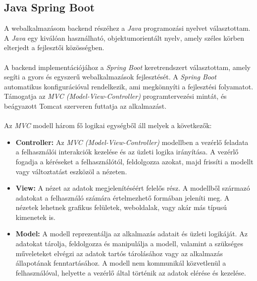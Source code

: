 \subsection{Java Spring Boot}

A webalkalmazásom backend részéhez a \textit{Java} \cite{java} programozási nyelvet választottam. A \textit{Java} egy kiválóan használható, objektumorientált nyelv, amely széles körben elterjedt a fejlesztői közösségben.\\
\\
A backend implementációjához a \textit{Spring Boot} \cite{spring_boot} keretrendszert választottam, amely segíti a gyors és egyszerű webalkalmazások fejlesztését. A \textit{Spring Boot} automatikus konfigurációval rendelkezik, ami megkönnyíti a fejlesztési folyamatot. Támogatja az \textit{MVC (Model-View-Controller)} \cite{mvc} programtervezési mintát, és beágyazott Tomcat szerveren futtatja az alkalmazást.\\ 
\\
Az \textit{MVC} modell három fő logikai egységből áll melyek a következők:

\begin{itemize}
\item \textbf{Controller:} Az \textit{MVC (Model-View-Controller)} modellben a vezérlő feladata a felhasználói interakciók kezelése és az üzleti logika irányítása. A vezérlő fogadja a kéréseket a felhasználótól, feldolgozza azokat, majd frissíti a modellt vagy változtatást eszközöl a nézeten.
\item \textbf{View:} A nézet az adatok megjelenítéséért felelős rész. A modellből származó adatokat a felhasználó számára értelmezhető formában jeleníti meg. A nézetek lehetnek grafikus felületek, weboldalak, vagy akár más típusú kimenetek is.
\item \textbf{Model:} A modell reprezentálja az alkalmazás adatait és üzleti logikáját. Az adatokat tárolja, feldolgozza és manipulálja a modell, valamint a szükséges műveleteket elvégzi az adatok tartós tárolásához vagy az alkalmazás állapotának fenntartásához. A modell nem kommunikál közvetlenül a felhasználóval, helyette a vezérlő által történik az adatok elérése és kezelése.
\end{itemize}

